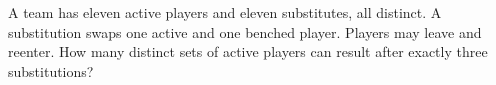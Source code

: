 A team has eleven active players and eleven substitutes, all distinct. A substitution swaps one active and one benched player. Players may leave and reenter. How many distinct sets of active players can result after exactly three substitutions?
